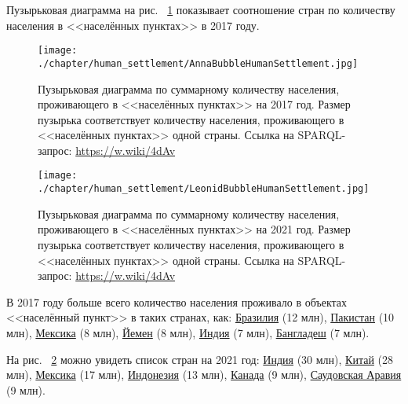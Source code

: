 Пузырьковая диаграмма на рис. ~\ref{fig:human-settlement-1} показывает соотношение стран по количеству населения в <<населённых пунктах>> в 2017 году.

\begin{figure}
\centering
	\texttt{[image: ./chapter/human\_settlement/AnnaBubbleHumanSettlement.jpg]}
	\label{fig:human-settlement-1}
    \caption[Пузырьковая диаграмма  по суммарному количеству населения в населённых пунктах, 2017.]{Пузырьковая диаграмма  по суммарному количеству населения, проживающего в <<населённых пунктах>> на 2017 год. Размер пузырька соответствует количеству населения, проживающего в <<населённых пунктах>> одной страны. Ссылка на SPARQL-запрос: \href{https://w.wiki/4dAv}{https://w.wiki/4dAv}}
\end{figure}

\begin{figure}
\centering
	\texttt{[image: ./chapter/human\_settlement/LeonidBubbleHumanSettlement.jpg]}
	\label{fig:human-settlement-2}
	\caption[Пузырьковая диаграмма  по суммарному количеству населения в населённых пунктах, 2021.]{Пузырьковая диаграмма  по суммарному количеству населения, проживающего в <<населённых пунктах>> на 2021 год. Размер пузырька соответствует количеству населения, проживающего в <<населённых пунктах>> одной страны. Ссылка на SPARQL-запрос: \href{https://w.wiki/4dAv}{https://w.wiki/4dAv}}
\end{figure}

В 2017 году больше всего количество населения проживало в объектах <<населённый пункт>> в таких странах, как: \href{http://www.wikidata.org/entity/Q155}{Бразилия} (\num{12} млн), \href{http://www.wikidata.org/entity/Q843}{Пакистан} (\num{10} млн), \href{http://www.wikidata.org/entity/Q96}{Мексика} (\num{8} млн), \href{http://www.wikidata.org/entity/Q805}{Йемен} (\num{8} млн), \href{http://www.wikidata.org/entity/Q668}{Индия} (\num{7} млн), \href{http://www.wikidata.org/entity/Q902}{Бангладеш} (\num{7} млн). 

На рис. ~\ref{fig:human-settlement-2} можно увидеть список стран на 2021 год: \href{http://www.wikidata.org/entity/Q668}{Индия} (\num{30} млн), \href{http://www.wikidata.org/entity/Q148}{Китай} (\num{28} млн), \href{http://www.wikidata.org/entity/Q96}{Мексика} (\num{17} млн), \href{http://www.wikidata.org/entity/Q252}{Индонезия} (\num{13} млн), \href{http://www.wikidata.org/entity/Q16}{Канада} (\num{9} млн), \href{http://www.wikidata.org/entity/Q851}{Саудовская Аравия} (\num{9} млн). 

